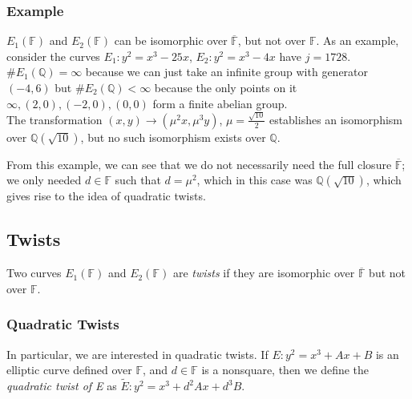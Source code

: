 \documentclass[12pt,twoside]{article}
\begin{document}
\subsubsection{Example}
$E_1(\mathbb F)$ and $E_2(\mathbb F)$ can be isomorphic over $\overline{\mathbb F}$, but not over $\mathbb F$. As an example, consider the curves $E_1: y^{2} = x^{3} - 25x$, $E_2: y^{2} = x^{3} - 4x$ have $j=1728$. $\#E_1(\mathbb Q) = \infty$ because we can just take an infinite group with generator $(-4,6)$ but $\#E_2(\mathbb Q) < \infty$ because the only points on it $\infty, (2,0), (-2,0), (0,0)$ form a finite abelian group. \\
The transformation $(x,y) \rightarrow (\mu^{2}x, \mu^{3}y)$, $\mu = \frac{\sqrt{10}}{2}$ establishes an isomorphism over $\mathbb Q(\sqrt{10})$, but no such isomorphism exists over $\mathbb Q$.

From this example, we can see that we do not necessarily need the full closure $\overline{\mathbb F}$; we only needed $d \in \mathbb F$ such that $d= \mu^{2}$, which in this case was $\mathbb Q(\sqrt{10})$, which gives rise to the idea of quadratic twists. 

\subsection{Twists} 
Two curves $E_1(\mathbb F)$ and $E_2(\mathbb F)$ are {\it twists} if they are isomorphic over $\overline{\mathbb F}$ but not over $\mathbb F$.
\subsubsection{Quadratic Twists}
In particular, we are interested in quadratic twists. If $E: y^2 = x^3 + Ax+ B$ is an elliptic curve defined over $\mathbb F$, and $d \in \mathbb F$ is a nonsquare, then we define the {\it quadratic twist of E} as $\tilde E: y^2 = x^3 + d^2Ax + d^3B$.
\end{document}
